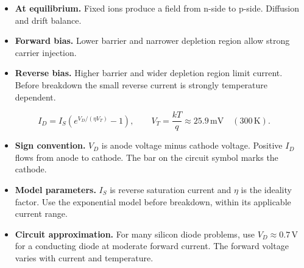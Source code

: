 \documentclass[12pt,a4paper]{article}
\begin{document}
\begin{itemize}[leftmargin=*, itemsep=3pt, topsep=4pt]
  \item \textbf{At equilibrium.} Fixed ions produce a field from n-side to p-side. Diffusion and drift balance.
  \item \textbf{Forward bias.} Lower barrier and narrower depletion region allow strong carrier injection.
  \item \textbf{Reverse bias.} Higher barrier and wider depletion region limit current. Before breakdown the small reverse current is strongly temperature dependent.
\end{itemize}
\[
I_D=I_S\left(e^{V_D/(\eta V_T)}-1\right),\qquad V_T=\frac{kT}{q}\approx25.9\,\mathrm{mV}\quad(300\,\mathrm K).
\]
\begin{itemize}[leftmargin=*, itemsep=3pt, topsep=4pt]
  \item \textbf{Sign convention.} \(V_D\) is anode voltage minus cathode voltage. Positive \(I_D\) flows from anode to cathode. The bar on the circuit symbol marks the cathode.
  \item \textbf{Model parameters.} \(I_S\) is reverse saturation current and \(\eta\) is the ideality factor. Use the exponential model before breakdown, within its applicable current range.
  \item \textbf{Circuit approximation.} For many silicon diode problems, use \(V_D\approx0.7\,\mathrm V\) for a conducting diode at moderate forward current. The forward voltage varies with current and temperature.
\end{itemize}

\begin{tcolorbox}[tikzbox,title={Diode current--voltage characteristic (schematic)},unbreakable]
\centering
{}
\end{tcolorbox}
\end{document}
